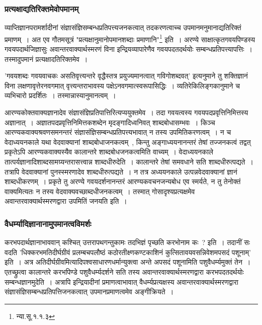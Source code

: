 		\subsubsection{प्रत्यक्षाद्यतिरिक्तमेवोपमानम्}

		व्याप्तिज्ञानपरामर्शादीनां संज्ञासंज्ञिसम्बन्धप्रतिपत्त्यजनकत्वात् तदकरणत्वाच्च उपमानमनुमानाद्यतिरिक्तं प्रमाणम्~। अत एव गौतमसूत्रं "प्रत्यक्षानुमानोपमानशब्दाः प्रमाणानि"\footnote{न्या.सू.१.१.३} इति~। अरण्ये साक्षात्कृतगवयपिण्डस्य गवयपदार्थजिज्ञासुः अवान्तरवाक्यार्थस्मरणं विना इन्द्रियव्यापारेणैव गवयपदतदर्थयोः सम्बन्धप्रतिपत्त्यापत्तिः~। तस्मादुपमानं प्रत्यक्षादतिरिक्तमेव~।

		'गवयशब्दः गवयवाचकः असतिवृत्त्यन्तरे वृद्धैस्तत्र प्रयुज्यमानत्वात् गविगोशब्दवत्' इत्यनुमाने तु शक्तिज्ञानं विना लक्षणावृत्तेरनवगमात् वृत्त्यन्तराभावस्य पक्षेऽनवगमात्स्वरूपासिद्धिः~। व्यतिरेकिलिङ्गकानुमाने च व्यभिचारो प्रदर्शितः~।‌ तस्मान्नास्यानुमानत्वम्~।

		आरण्यकोक्तवाक्यज्ञानादेव संज्ञासंज्ञिप्रतिपात्तिरित्यप्ययुक्तमेव~। तदा गवयत्वस्य गवयपदप्रवृत्तिनिमित्तस्य अज्ञानात्~। अज्ञातपदप्रवृत्तिनिमित्तकशब्देन मृदङ्गादिध्वनिवत् शाब्दबोधासम्भवः~। किञ्च आरण्यकवाक्यश्रवणसमनन्तरं संज्ञासंज्ञिसम्बन्धप्रतिपत्त्यभावात् न तस्य उपमितिकरणत्वम्~। न च वेदाध्ययनकाले यथा वेदवाक्यानां शाब्दबोधाजनकत्वम्~, किन्तु अङ्गाध्ययनानन्तरं तेषां तज्जनकत्वं तद्वत् प्रकृतेऽपि आरण्यकवाक्यस्यैव कालान्तरे शाब्दबोधजनकत्वमिति वाच्यम्~। वेदाध्ययनकाले तात्पर्यज्ञानादिशाब्दसामग्र्यन्तरासत्त्वान्न शाब्दधीरुदेति~। कालान्तरे तेषां समवधाने सति शाब्दधीरुत्पद्यते~। तत्रापि वेदवाक्यानां पुनस्स्मरणादेव शाब्दधीरुत्पद्यते~। न तत्र अध्ययनकाले उत्पन्नवेदवाक्यानां ज्ञानं शाब्दधीकरणम्~। प्रकृते तु अरण्ये गवयदर्शनानन्तरं आरण्यकवचनजन्यबोध एव स्मर्यते, न तु तेनोक्तं वाक्यमित्यतः न तस्य वेदवाक्यवच्छाब्दधीजनकत्वम्~। तस्मात् गोसादृश्यप्रत्यक्षमेव अवान्तरवाक्यार्थस्मरणद्वारा उपमितिं जनयति इति~।

		\subsubsection{वैधर्म्यादिज्ञानानामुपमानत्वविमर्शः}

		करभपदार्थज्ञानाभाववान् कश्चित् उत्तरापथगन्तुकामः तदभिज्ञं पृच्छति करभोनाम कः~? इति~। तदानीं सः वदति 'धिक्करभमतिदीर्घग्रीवं प्रलम्बचपलौष्ठं कठोरतीक्ष्णकण्टकाशिनं कुत्सितावयवसन्निवेशमपसदं पशूनाम्' इति~। अत्र अतिदीर्घग्रीवमित्यादिपश्वसाधारणधर्मान्युक्त्वा अन्ते अपसदं पशूनामिति पशुवैधर्म्यमुक्तं तेन~। एतच्छ्रुत्वा कालान्तरे करभपिण्डे पशुवैधर्म्यदर्शने सति तस्य अवान्तरवाक्यार्थस्मरणद्वारा करभपदतदर्थयोः सम्बन्धज्ञानमुदेति~। अत्रापि इन्द्रियादीनां प्रमाणत्वाभावात् वैधर्म्यप्रत्यक्षस्य अवान्तरवाक्यार्थस्मरणद्वारा संज्ञासंज्ञिसम्बन्धप्रतिपत्तिजनकत्वात् उपमानप्रमाणत्वमेव अङ्गीक्रियते~।

